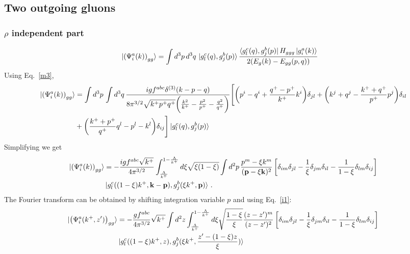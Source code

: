 \documentclass[aps,prd,amsmath,amssymb,nofootinbib]{revtex4-2}
\def\v#1{\mathbf{#1}}
\numberwithin{equation}{section}
\begin{document}
\subsection{Two outgoing gluons}   
\subsubsection{$\rho$ independent part}
\begin{figure}[h]
\end{figure}
\begin{align}\label{rhoindep}
  \ket{ \left(\Psi^{a}_{i}(k) \right)_{gg} } & =
   \int d^{3}p\, d^{3}q \, 
   \ket{g^{c}_{l}(q),g^{b}_{j}(p)}
   \frac{\bra{g^{c}_{l}(q),g^{b}_{j}(p)} H_{ggg} \ket{g^{a}_{i}(k)}}{2(E_g(k)-E_{gg}(p,q))}
\end{align}
Using Eq.~\eqref{m3}, 
\begin{align}
 \ket{ \left(\Psi^{a}_{i}(k) \right)_{gg} } & = \int d^{3}p\,\int d^{3}q\,\frac{igf^{abc}\delta^{(3)}(k-p-q)}{8\pi^{3/2}\sqrt{k^{+}p^{+}q^{+}}\bigg(\frac{k^{2}}{k^{+}}-\frac{p^{2}}{p^{+}}-\frac{q^{2}}{q^{+}}\bigg)}\Bigg[\bigg(p^{i}-q^{i}+\frac{q^{+}-p^{+}}{k^{+}}k^{i}\bigg)\delta_{jl}+\bigg(k^{j}+q^{j}-\frac{k^{+}+q^{+}}{p^{+}}p^{j}\bigg)\delta_{il}\notag \\ & +\bigg(\frac{k^{+}+p^{+}}{q^{+}}q^{l}-p^{l}-k^{l}\bigg)\delta_{ij}\Bigg]  \ket{g^{c}_{l}(q),g^{b}_{j}(p)}
 \end{align}
 Simplifying we get 
 \begin{align}
\ket{ \left(\Psi^{a}_{i}(k) \right)_{gg} } &  = -\frac{ i g f^{abc}\sqrt{k^+}} {4\pi^{3/2}} 
  \int_{ \frac{\Lambda}{k^+} }^{1 -  \frac{\Lambda}{k^+} } d\xi  \sqrt{\xi (1-\xi)} 
   \int d^{2}p\,  
   \frac{p^m - \xi k^m  }{( \v{p}- \xi \v{k} )^2 } \left[ \delta_{im} \delta_{jl}
     - \frac{1}{\xi}\delta_{jm} \delta_{il}
   - \frac{1}{1-\xi} \delta_{lm}\delta_{ij}
 \right]\notag \\ & 
 \ket{g^{c}_{l}((1-\xi)k^+,\v{k}-\v{p}),g^{b}_{j}(\xi k^+,\v{p})} 
 \,.
\end{align}
The Fourier transform can be obtained by shifting integration variable $p$ and using Eq.~\eqref{i1}: 
\begin{align}\label{gindeppos}
    \ket{\left(\Psi^{a}_{i}(k^{+},z^{\prime})\right)_{gg}} & =  - \frac{g f^{abc}}{4\pi^{3/2}}\sqrt{k^+} \int d^2 z \int_{ \frac{\Lambda}{k^+} }^{1 -  \frac{\Lambda}{k^+} }  d\xi \sqrt{\frac{1-\xi} {\xi} }  \frac{(z-z^{\prime})^{m}}{(z-z^{\prime})^{2}}  \left[ \delta_{im} \delta_{jl}
     -\frac{1}{\xi}\delta_{jm} \delta_{il}
   -\frac{1}{1-\xi} \delta_{lm} \delta_{ij}
 \right] \notag \\ & \ket{g^{c}_{l}((1-\xi)k^{+},z),g^{b}_{j}(\xi k^{+},\frac{z^{\prime}-(1-\xi)z}{\xi})}
\end{align}
\end{document}
